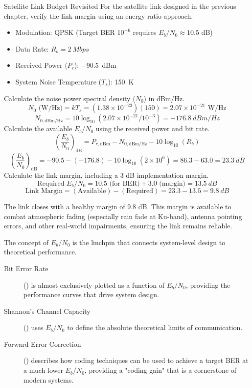 \begin{workedexample}{Satellite Link Budget Revisited}
     For the satellite link designed in the previous chapter, verify the link margin using an energy ratio approach.
    \begin{itemize}
        \item Modulation: QPSK (Target BER $10^{-6}$ requires $E_b/N_0 \approx 10.5$ dB)
        \item Data Rate: $R_b = \qty{2}{Mbps}$
        \item Received Power ($P_r$): \qty{-90.5}{dBm}
        \item System Noise Temperature ($T_s$): \qty{150}{K}
    \end{itemize}
    \begin{derivationsteps}
        \step Calculate the noise power spectral density ($N_0$) in dBm/Hz.
        \[ N_0 \text{ (W/Hz)} = kT_s = (1.38 \times 10^{-23})(150) = 2.07 \times 10^{-21} \text{ W/Hz} \]
        \[ N_{0, \text{dBm/Hz}} = 10\log_{10}(2.07 \times 10^{-21} / 10^{-3}) = \qty{-176.8}{dBm/Hz} \]
        \step Calculate the available $E_b/N_0$ using the received power and bit rate.
        \[ \left(\frac{E_b}{N_0}\right)_{\text{dB}} = P_{r, \text{dBm}} - N_{0, \text{dBm/Hz}} - 10\log_{10}(R_b) \]
        \[ \left(\frac{E_b}{N_0}\right)_{\text{dB}} = -90.5 - (-176.8) - 10\log_{10}(2 \times 10^6) = 86.3 - 63.0 = \qty{23.3}{dB} \]
        \step Calculate the link margin, including a 3 dB implementation margin.
        \[ \text{Required } E_b/N_0 = 10.5 \text{ (for BER)} + 3.0 \text{ (margin)} = \qty{13.5}{dB} \]
        \[ \text{Link Margin} = (\text{Available}) - (\text{Required}) = 23.3 - 13.5 = \qty{9.8}{dB} \]
    \end{derivationsteps}
     The link closes with a healthy margin of 9.8 dB. This margin is available to combat atmospheric fading (especially rain fade at Ku-band), antenna pointing errors, and other real-world impairments, ensuring the link remains reliable.
\end{workedexample}

\begin{importantbox}[title={Further Reading}]
    The concept of $E_b/N_0$ is the linchpin that connects system-level design to theoretical performance.
    \begin{description}
        \item[Bit Error Rate] () is almost exclusively plotted as a function of $E_b/N_0$, providing the performance curves that drive system design.
        \item[Shannon's Channel Capacity] () uses $E_b/N_0$ to define the absolute theoretical limits of communication.
        \item[Forward Error Correction] () describes how coding techniques can be used to achieve a target BER at a much lower $E_b/N_0$, providing a "coding gain" that is a cornerstone of modern systems.
    \end{description}
\end{importantbox}